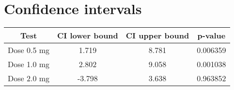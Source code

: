 \documentclass[]{article}
\begin{document}
\section{Confidence intervals}\label{confidence-intervals}

\begin{longtable}[c]{@{}cccc@{}}
\toprule
\begin{minipage}[b]{0.15\columnwidth}\centering\strut
Test
\strut\end{minipage} &
\begin{minipage}[b]{0.21\columnwidth}\centering\strut
CI lower bound
\strut\end{minipage} &
\begin{minipage}[b]{0.21\columnwidth}\centering\strut
CI upper bound
\strut\end{minipage} &
\begin{minipage}[b]{0.11\columnwidth}\centering\strut
p-value
\strut\end{minipage}\tabularnewline
\midrule
\endhead
\begin{minipage}[t]{0.15\columnwidth}\centering\strut
Dose 0.5 mg
\strut\end{minipage} &
\begin{minipage}[t]{0.21\columnwidth}\centering\strut
1.719
\strut\end{minipage} &
\begin{minipage}[t]{0.21\columnwidth}\centering\strut
8.781
\strut\end{minipage} &
\begin{minipage}[t]{0.11\columnwidth}\centering\strut
0.006359
\strut\end{minipage}\tabularnewline
\begin{minipage}[t]{0.15\columnwidth}\centering\strut
Dose 1.0 mg
\strut\end{minipage} &
\begin{minipage}[t]{0.21\columnwidth}\centering\strut
2.802
\strut\end{minipage} &
\begin{minipage}[t]{0.21\columnwidth}\centering\strut
9.058
\strut\end{minipage} &
\begin{minipage}[t]{0.11\columnwidth}\centering\strut
0.001038
\strut\end{minipage}\tabularnewline
\begin{minipage}[t]{0.15\columnwidth}\centering\strut
Dose 2.0 mg
\strut\end{minipage} &
\begin{minipage}[t]{0.21\columnwidth}\centering\strut
-3.798
\strut\end{minipage} &
\begin{minipage}[t]{0.21\columnwidth}\centering\strut
3.638
\strut\end{minipage} &
\begin{minipage}[t]{0.11\columnwidth}\centering\strut
0.963852
\strut\end{minipage}\tabularnewline
\bottomrule
\end{longtable}
\end{document}

